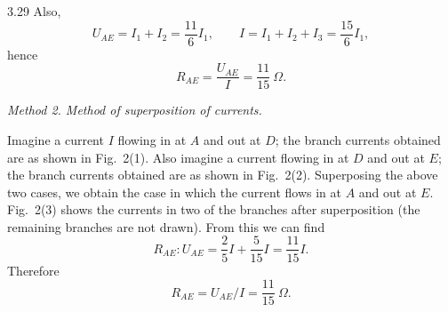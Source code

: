 \begin{solution}{3.29}
Also,
\[
U_{AE}=I_1+I_2=\frac{11}{6}I_1,\qquad
I=I_1+I_2+I_3=\frac{15}{6}I_1,
\]
hence
\[
R_{AE}=\frac{U_{AE}}{I}=\frac{11}{15}\ \Omega.
\]

\textit{Method 2. Method of superposition of currents.}

Imagine a current $I$ flowing in at $A$ and out at $D$; the branch currents obtained are as shown in Fig.~2(1). Also imagine a current flowing in at $D$ and out at $E$; the branch currents obtained are as shown in Fig.~2(2). Superposing the above two cases, we obtain the case in which the current flows in at $A$ and out at $E$. Fig.~2(3) shows the currents in two of the branches after superposition (the remaining branches are not drawn). From this we can find
\[
R_{AE}:U_{AE}=\frac{2}{5}I+\frac{5}{15}I=\frac{11}{15}I.
\]
Therefore
\[
R_{AE}=U_{AE}/I=\frac{11}{15}\ \Omega.
\]


\end{solution}
